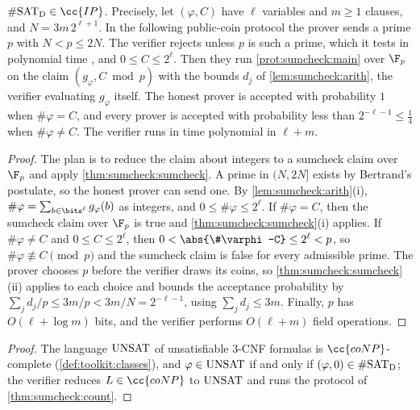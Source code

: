 \begin{refsection}
\begin{theorem}\label{thm:sumcheck:count}
$\sumcheckcount\in\cc{IP}$. Precisely, let $(\varphi,C)$ have $\ell$ variables and $m\ge1$ clauses, and $N=3m\,2^{\ell+1}$. In the following public-coin protocol the prover sends a prime $p$ with $N<p\le2N$. The verifier rejects unless $p$ is such a prime, which it tests in polynomial time \parencite{AgrawalKayalSaxena2004}, and $0\le C\le2^\ell$. Then they run \cref{prot:sumcheck:main} over $\F_p$ on the claim $(g_\varphi,C\bmod p)$ with the bounds $d_j$ of \cref{lem:sumcheck:arith}, the verifier evaluating $g_\varphi$ itself. The honest prover is accepted with probability $1$ when $\#\varphi=C$, and every prover is accepted with probability less than $2^{-\ell-1}\le\frac14$ when $\#\varphi\ne C$. The verifier runs in time polynomial in $\ell+m$.
\end{theorem}

\begin{proof}
The plan is to reduce the claim about integers to a sumcheck claim over $\F_p$ and apply \cref{thm:sumcheck:sumcheck}. A prime in $(N,2N]$ exists by Bertrand's postulate, so the honest prover can send one. By \cref{lem:sumcheck:arith}(i), $\#\varphi=\sum_{b\in\bits^\ell}g_\varphi(b)$ as integers, and $0\le\#\varphi\le2^\ell$. If $\#\varphi=C$, then the sumcheck claim over $\F_p$ is true and \cref{thm:sumcheck:sumcheck}(i) applies. If $\#\varphi\ne C$ and $0\le C\le2^\ell$, then $0<\abs{\#\varphi-C}\le2^\ell<p$, so $\#\varphi\not\equiv C\pmod p$ and the sumcheck claim is false for every admissible prime. The prover chooses $p$ before the verifier draws its coins, so \cref{thm:sumcheck:sumcheck}(ii) applies to each choice and bounds the acceptance probability by $\sum_jd_j/p\le3m/p<3m/N=2^{-\ell-1}$, using $\sum_jd_j\le3m$. Finally, $p$ has $O(\ell+\log m)$ bits, and the verifier performs $O(\ell+m)$ field operations.
\end{proof}


\begin{proof}
The language $\mathrm{UNSAT}$ of unsatisfiable 3-CNF formulas is $\cc{coNP}$-complete (\cref{def:toolkit:classes}), and $\varphi\in\mathrm{UNSAT}$ if and only if $(\varphi,0)\in\#\mathrm{SAT}_{\mathrm{D}}$; the verifier reduces $L\in\cc{coNP}$ to $\mathrm{UNSAT}$ and runs the protocol of \cref{thm:sumcheck:count}.
\end{proof}


\end{refsection}
